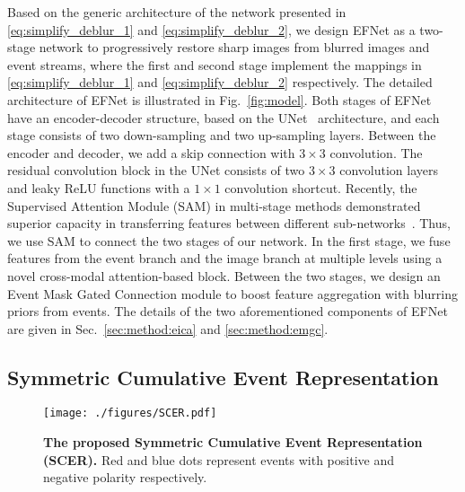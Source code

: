 \documentclass[runningheads]{llncs}
\newcommand{\PAR}[1]{\noindent{\bf #1}}
\newlength \g
\begin{document}
\PAR{Two-stage backbone.} Based on the generic architecture of the network presented in \eqref{eq:simplify_deblur_1} and \eqref{eq:simplify_deblur_2}, we design EFNet as a two-stage network to progressively restore sharp images from blurred images and event streams, where the first and second stage implement the mappings in \eqref{eq:simplify_deblur_1} and \eqref{eq:simplify_deblur_2} respectively. The detailed architecture of EFNet is illustrated in Fig.~\ref{fig:model}. Both stages of EFNet have an encoder-decoder structure, based on the UNet~\cite{ronneberger2015u} architecture, and each stage consists of two down-sampling and two up-sampling layers. Between the encoder and decoder, we add a skip connection with $3\times3$ convolution. The residual convolution block in the UNet consists of two $3\times3$ convolution layers and leaky ReLU functions with a $1\times1$ convolution shortcut. Recently, the Supervised Attention Module (SAM) in multi-stage methods demonstrated superior capacity in transferring features between different sub-networks~\cite{chen2021hinet,zamir2021multi}. Thus, we use SAM to connect the two stages of our network. In the first stage, we fuse features from the event branch and the image branch at multiple levels using a novel cross-modal attention-based block. Between the two stages, we design an Event Mask Gated Connection module to boost feature aggregation with blurring priors from events. The details of the two aforementioned components of EFNet are given in Sec.~\ref{sec:method:eica} and \ref{sec:method:emgc}.

\subsection{Symmetric Cumulative Event Representation}
\label{sec:method:event:representation}

\begin{wrapfigure}{l}{0.5\textwidth}
  \vspace{-30pt}
  \begin{center}
   \texttt{[image: ./figures/SCER.pdf]}
  \end{center}
  \vspace{-10pt}
\caption{\textbf{The proposed Symmetric Cumulative Event Representation (SCER).} Red and blue dots represent events with positive and negative polarity respectively. }
\vspace{-17pt}
  \label{fig:event_representation}
\end{wrapfigure}
\end{document}

